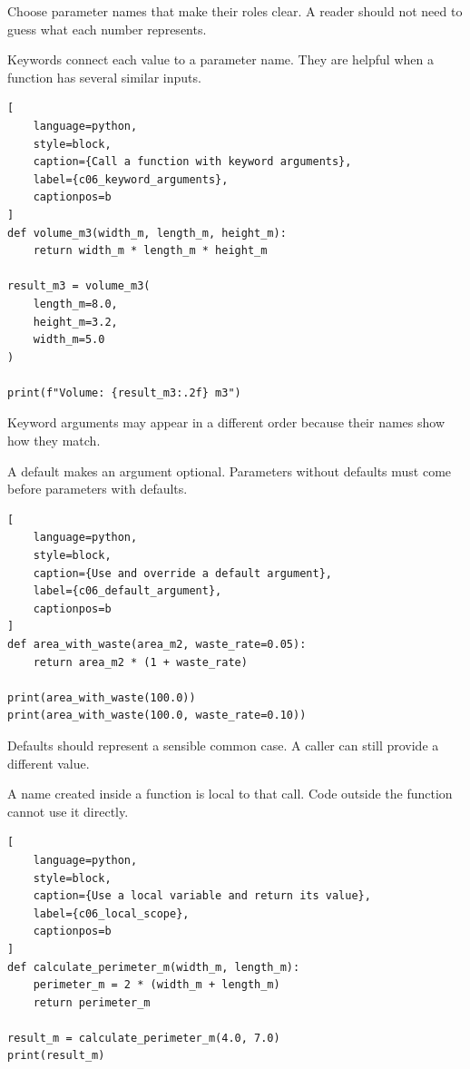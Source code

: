Choose parameter names that make their roles clear. A reader should not need to
guess what each number represents.


Keywords connect each value to a parameter name. They are helpful when a
function has several similar inputs.

\begin{lstlisting}[
    language=python,
    style=block,
    caption={Call a function with keyword arguments},
    label={c06_keyword_arguments},
    captionpos=b
]
def volume_m3(width_m, length_m, height_m):
    return width_m * length_m * height_m

result_m3 = volume_m3(
    length_m=8.0,
    height_m=3.2,
    width_m=5.0
)

print(f"Volume: {result_m3:.2f} m3")
\end{lstlisting}

Keyword arguments may appear in a different order because their names show how
they match.


A default makes an argument optional. Parameters without defaults must come
before parameters with defaults.

\begin{lstlisting}[
    language=python,
    style=block,
    caption={Use and override a default argument},
    label={c06_default_argument},
    captionpos=b
]
def area_with_waste(area_m2, waste_rate=0.05):
    return area_m2 * (1 + waste_rate)

print(area_with_waste(100.0))
print(area_with_waste(100.0, waste_rate=0.10))
\end{lstlisting}

Defaults should represent a sensible common case. A caller can still provide a
different value.


A name created inside a function is local to that call. Code outside the
function cannot use it directly.

\begin{lstlisting}[
    language=python,
    style=block,
    caption={Use a local variable and return its value},
    label={c06_local_scope},
    captionpos=b
]
def calculate_perimeter_m(width_m, length_m):
    perimeter_m = 2 * (width_m + length_m)
    return perimeter_m

result_m = calculate_perimeter_m(4.0, 7.0)
print(result_m)
\end{lstlisting}

